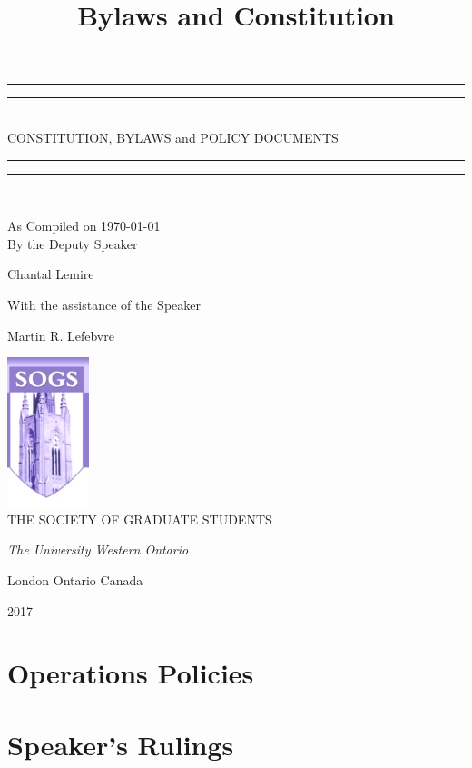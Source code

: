 \documentclass[12pt,letterpaper]{book}
\title{Bylaws and Constitution}
\newcommand*{\titleGP}{\begingroup %
\centering %
\vspace*{\baselineskip} %

\rule{\textwidth}{1.6pt}\vspace*{-\baselineskip}\vspace*{2pt} %
\rule{\textwidth}{0.4pt}\\[\baselineskip] %

{\LARGE CONSTITUTION, BYLAWS} 
and
{\LARGE POLICY DOCUMENTS}

\rule{\textwidth}{0.4pt}\vspace*{-\baselineskip}\vspace{3.2pt} %
\rule{\textwidth}{1.6pt}\\[\baselineskip] %



\vspace*{2\baselineskip} %

As Compiled on \today \\[\baselineskip]
By the Deputy Speaker

{\Large Chantal Lemire \par} %
\vspace*{\baselineskip} %
With the assistance of the Speaker \\[\baselineskip]
{\large Martin R. Lefebvre \par}


\vfill %

\includegraphics{logo.jpg}\\[1cm]


{\large THE SOCIETY OF GRADUATE STUDENTS}\par %
\scshape %
{\itshape The University Western Ontario\par} %
London Ontario Canada\par %
{\scshape 2017} \\[0.3\baselineskip] %
\endgroup}
\begin{document}
 

\pagestyle{empty} %

\titleGP %

\tableofcontents %
\pagebreak %
\pagestyle{plain}






%

%



\chapter{Operations Policies}

 
 
 
 

% 
% 

\chapter{Speaker's Rulings}



\newpage
 
%
\printindex
\end{document}
